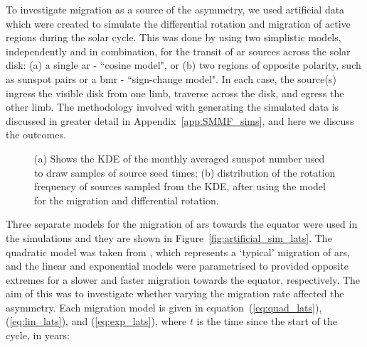 To investigate migration as a source of the asymmetry, we used artificial data which were created to simulate the differential rotation and migration of active regions during the solar cycle. This was done by using two simplistic models, independently and in combination, for the transit of \gls{ar} sources across the solar disk: (a) a single \gls{ar} - ``cosine model", or (b) two regions of opposite polarity, such as sunspot pairs or a \gls{bmr} - ``sign-change model". In each case, the source(s) ingress the visible disk from one limb, traverse across the disk, and egress the other limb. The methodology involved with generating the simulated data is discussed in greater detail in Appendix~\ref{app:SMMF_sims}, and here we discuss the outcomes.

\begin{figure}[ht!]
	\centering
	\qquad
	\caption{(a) Shows the KDE of the monthly averaged sunspot number used to draw samples of source seed times; (b) distribution of the rotation frequency of sources sampled from the KDE, after using the model for the migration and differential rotation.} 
	\label{fig:KDE_lats}
\end{figure}

Three separate models for the migration of \glspl{ar} towards the equator were used in the simulations and they are shown in Figure~\ref{fig:artificial_sim_lats}. The quadratic model was taken from \citet{li_latitude_2001}, which represents a `typical' migration of \glspl{ar}, and the linear and exponential models were parametrised to provided opposite extremes for a slower and faster migration towards the equator, respectively. The aim of this was to investigate whether varying the migration rate affected the asymmetry. Each migration model is given in equation~(\ref{eq:quad_lats}), (\ref{eq:lin_lats}), and (\ref{eq:exp_lats}), where $t$ is the time since the start of the cycle, in years:

